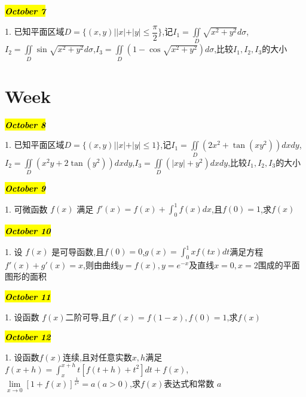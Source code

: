 \hl{\textbf{\textit{October 7}}}

1. 已知平面区域$D=\{(x,y)||x|+|y|\leq \dfrac{\pi}{2}\}$,记$I_{1}=\iint\limits_{D}\sqrt{x^2+y^2}d\sigma$,$I_{2}=\iint\limits_{D}\sin\sqrt{x^2+y^2}d\sigma$,$I_{3}=\iint\limits_{D}(1-\cos\sqrt{x^2+y^2})d\sigma$,比较$I_{1},I_{2},I_{3}$的大小
\begin{solution}
	
\end{solution}

\section{Week }
\hl{\textbf{\textit{October 8}}}

1. 已知平面区域$D=\{(x,y)||x|+|y|\leq 1\}$,记$I_{1}=\iint\limits_{D}(2x^{2}+\tan(xy^2))dxdy$,$I_{2}=\iint\limits_{D}(x^{2}y+2\tan(y^2))dxdy$,$I_{3}=\iint\limits_{D}(|xy|+y^2)dxdy$,比较$I_{1},I_{2},I_{3}$的大小
\begin{solution}
	
\end{solution}

\hl{\textbf{\textit{October 9}}}

1. 可微函数 $f(x)$ 满足 $f'(x)=f(x)+\int_{0}^{1}f(x)dx$,且$f(0)=1$,求$f(x)$
\begin{solution}
	
\end{solution}

\hl{\textbf{\textit{October 10}}}

1. 设 $f(x)$ 是可导函数,且$f(0)=0$,$g(x)=\int_{0}^{1}xf(tx)dt$满足方程$f'(x)+g'(x)=x$,则由曲线$y=f(x),y=e^{-x}$及直线$x=0,x=2$围成的平面图形的面积
\begin{solution}
	
\end{solution}

\hl{\textbf{\textit{October 11}}}

1. 设函数 $f(x)$二阶可导,且$f'(x)=f(1-x),f(0)=1$,求$f(x)$
\begin{solution}
	
\end{solution}

\hl{\textbf{\textit{October 12}}}

1. 设函数$f(x)$连续,且对任意实数$x,h$满足$f(x+h)=\int_{x}^{x+h}t\left[f(t+h)+t^2 \right]dt+f(x)$,$\lim\limits_{x\rightarrow 0 }\left[ 1+f(x)\right]^{\frac{1}{x^4}}=a(a>0) $,求$f(x)$表达式和常数 $a$
\begin{solution}
	
\end{solution}

